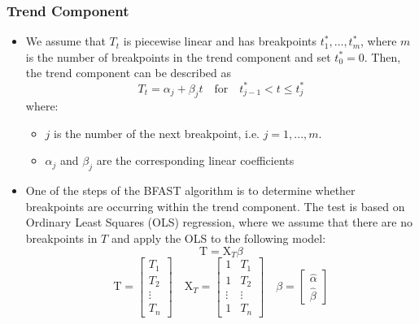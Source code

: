 \documentclass[presentation.tex]{subfiles}
\begin{document}
\begin{frame}
  \frametitle{Trend Component}
  \begin{itemize}
  \item 
  We assume that $T_t$ is piecewise linear and has breakpoints $t_1^*,\hdots, t_m^*$,
  where $m$ is the number of breakpoints in the trend component and set $t_0^* = 0$.
  Then, the trend component can be described as
  \[
  T_t = \alpha_j + \beta_j t \quad \text{for}\quad t^*_{j-1}<t\leq t_j^*
  \]
  where:
  \begin{itemize}
  \item $j$ is the number of the next breakpoint, i.e. $j = 1,...,m$.
  \item $\alpha_j$ and $\beta_j$ are the corresponding linear coefficients
  \end{itemize}
\item One of the steps of the BFAST algorithm is to determine whether
  breakpoints are occurring within the trend component. The test is based on Ordinary Least
  Squares (OLS) regression, where we assume that there are no breakpoints
  in $T$ and apply the OLS to the following model:
    \[
    \mathrm{T} = \mathrm{X}_T \beta
    \]
    \[
    \mathrm{T} = 
    \begin{bmatrix}
      T_1 \\
      T_2 \\
      \vdots \\
      T_n 
    \end{bmatrix}
    \quad
    \mathrm{X}_T = 
    \begin{bmatrix}
      1 & T_1 \\
      1 & T_2 \\
      \vdots & \vdots \\
      1 & T_n 
    \end{bmatrix}
    \quad
    \beta =
    \begin{bmatrix}
      \hat{\alpha} \\
      \hat{\beta}
    \end{bmatrix}
    \]
  \end{itemize}
\end{frame}
\end{document}

